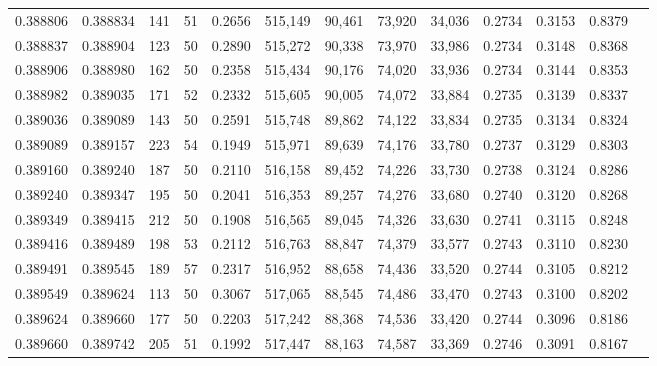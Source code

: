\begin{tabular}{rrrrrrrrrrrrr}
0.388806 & 0.388834 &   141 &  51 &                                     0.2656 & 515,149 &  90,461 &  73,920 &  34,036 & 0.2734 & 0.3153 & 0.8379 \\
0.388837 & 0.388904 &   123 &  50 &                                     0.2890 & 515,272 &  90,338 &  73,970 &  33,986 & 0.2734 & 0.3148 & 0.8368 \\
0.388906 & 0.388980 &   162 &  50 &                                     0.2358 & 515,434 &  90,176 &  74,020 &  33,936 & 0.2734 & 0.3144 & 0.8353 \\
0.388982 & 0.389035 &   171 &  52 &                                     0.2332 & 515,605 &  90,005 &  74,072 &  33,884 & 0.2735 & 0.3139 & 0.8337 \\
0.389036 & 0.389089 &   143 &  50 &                                     0.2591 & 515,748 &  89,862 &  74,122 &  33,834 & 0.2735 & 0.3134 & 0.8324 \\
0.389089 & 0.389157 &   223 &  54 &                                     0.1949 & 515,971 &  89,639 &  74,176 &  33,780 & 0.2737 & 0.3129 & 0.8303 \\
0.389160 & 0.389240 &   187 &  50 &                                     0.2110 & 516,158 &  89,452 &  74,226 &  33,730 & 0.2738 & 0.3124 & 0.8286 \\
0.389240 & 0.389347 &   195 &  50 &                                     0.2041 & 516,353 &  89,257 &  74,276 &  33,680 & 0.2740 & 0.3120 & 0.8268 \\
0.389349 & 0.389415 &   212 &  50 &                                     0.1908 & 516,565 &  89,045 &  74,326 &  33,630 & 0.2741 & 0.3115 & 0.8248 \\
0.389416 & 0.389489 &   198 &  53 &                                     0.2112 & 516,763 &  88,847 &  74,379 &  33,577 & 0.2743 & 0.3110 & 0.8230 \\
0.389491 & 0.389545 &   189 &  57 &                                     0.2317 & 516,952 &  88,658 &  74,436 &  33,520 & 0.2744 & 0.3105 & 0.8212 \\
0.389549 & 0.389624 &   113 &  50 &                                     0.3067 & 517,065 &  88,545 &  74,486 &  33,470 & 0.2743 & 0.3100 & 0.8202 \\
0.389624 & 0.389660 &   177 &  50 &                                     0.2203 & 517,242 &  88,368 &  74,536 &  33,420 & 0.2744 & 0.3096 & 0.8186 \\
0.389660 & 0.389742 &   205 &  51 &                                     0.1992 & 517,447 &  88,163 &  74,587 &  33,369 & 0.2746 & 0.3091 & 0.8167 \\

\end{tabular}
